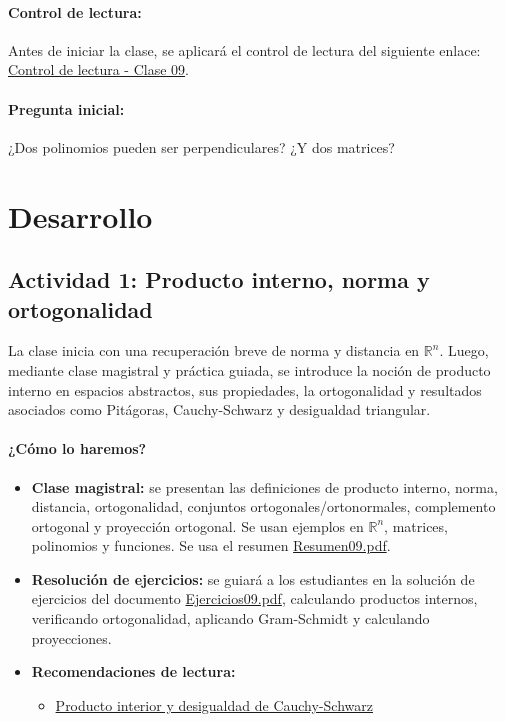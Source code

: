\documentclass[a4,11pt]{aleph-notas}
\begin{document}
\paragraph{Control de lectura:}
Antes de iniciar la clase, se aplicará el control de lectura del siguiente enlace:
\href{https://gemini.google.com/share/7d22976ac15d}{Control de lectura - Clase 09}.

\paragraph{Pregunta inicial:}
¿Dos polinomios pueden ser perpendiculares? ¿Y dos matrices?

\section*{Desarrollo}

\subsection*{Actividad 1: Producto interno, norma y ortogonalidad}

La clase inicia con una recuperación breve de norma y distancia en $\mathbb{R}^n$. Luego, mediante clase magistral y práctica guiada, se introduce la noción de producto interno en espacios abstractos, sus propiedades, la ortogonalidad y resultados asociados como Pitágoras, Cauchy-Schwarz y desigualdad triangular.

\paragraph{¿Cómo lo haremos?}
\begin{itemize}[leftmargin=*]
    \item \textbf{Clase magistral:} se presentan las definiciones de producto interno, norma, distancia, ortogonalidad, conjuntos ortogonales/ortonormales, complemento ortogonal y proyección ortogonal. Se usan ejemplos en $\mathbb{R}^n$, matrices, polinomios y funciones. Se usa el resumen \href{https://fcena-puce.github.io/AlgebraLineal-05-N0048/01Resumen/Resumen09.pdf}{Resumen09.pdf}.
    \item \textbf{Resolución de ejercicios:} se guiará a los estudiantes en la solución de ejercicios del documento \href{https://fcena-puce.github.io/AlgebraLineal-05-N0048/04Ejercicios/Ejercicios09.pdf}{Ejercicios09.pdf}, calculando productos internos, verificando ortogonalidad, aplicando Gram-Schmidt y calculando proyecciones.
    \item \textbf{Recomendaciones de lectura:} 
    \begin{itemize}
        \item \href{https://blog.nekomath.com/algebra-lineal-i-producto-interior-y-desigualdad-de-cauchy-schwarz/}{Producto interior y desigualdad de Cauchy-Schwarz}
    \end{itemize}
\end{itemize}
\end{document}
